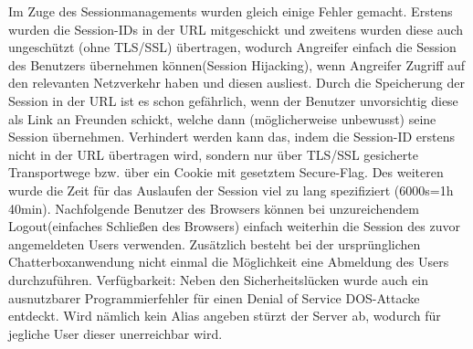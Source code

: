 \documentclass[12pt,a4paper,titlepage,oneside]{scrartcl}
\begin{document}
Im Zuge des Sessionmanagements wurden gleich einige Fehler gemacht. Erstens wurden die Session-IDs in der URL mitgeschickt und zweitens wurden diese auch ungeschützt (ohne TLS/SSL) übertragen, wodurch Angreifer einfach die Session des Benutzers übernehmen können(Session Hijacking), wenn Angreifer Zugriff auf den relevanten Netzverkehr haben und diesen ausliest. Durch die Speicherung der Session in der URL ist es schon gefährlich, wenn der Benutzer unvorsichtig diese als Link an Freunden schickt, welche dann (möglicherweise unbewusst) seine Session übernehmen. Verhindert werden kann das, indem die Session-ID erstens nicht in der URL übertragen wird, sondern nur über TLS/SSL gesicherte Transportwege bzw. über ein Cookie mit gesetztem Secure-Flag. 
Des weiteren wurde die Zeit  für das Auslaufen der Session viel zu lang spezifiziert (6000s=1h 40min). Nachfolgende Benutzer des Browsers können bei unzureichendem Logout(einfaches Schließen des Browsers) einfach weiterhin die Session des zuvor angemeldeten Users verwenden. Zusätzlich besteht bei der ursprünglichen Chatterboxanwendung nicht einmal die Möglichkeit eine Abmeldung des Users durchzuführen.
\newline
\newline
Verfügbarkeit: Neben den Sicherheitslücken wurde auch ein ausnutzbarer Programmierfehler für einen Denial of Service DOS-Attacke entdeckt. Wird nämlich kein Alias angeben stürzt der Server ab, wodurch für jegliche User dieser unerreichbar wird.
\end{document}
